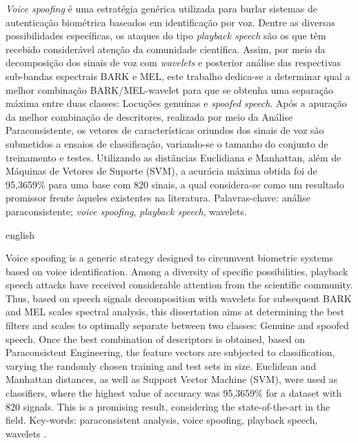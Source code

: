 \begin{resumo}
	\par \textit{Voice spoofing} é uma estratégia genérica utilizada para burlar sistemas de autenticação biométrica baseados em identificação por voz. Dentre as diversas possibilidades específicas, os ataques do tipo \textit{playback speech} são os que têm recebido considerável atenção da comunidade científica. Assim, por meio da decomposição dos sinais de voz com \textit{wavelets} e posterior análise das respectivas sub-bandas espectrais BARK e MEL, este trabalho dedica-se a determinar qual a melhor combinação BARK/MEL-wavelet para que se obtenha uma separação máxima entre duas classes: Locuções genuínas e \textit{spoofed speech}. Após a apuração da melhor combinação de descritores, realizada por meio da Análise Paraconsistente, os vetores de características oriundos dos sinais de voz são submetidos a ensaios de classificação, variando-se o tamanho do conjunto de treinamento e testes. Utilizando as distâncias Euclidiana e Manhattan, além de Máquinas de Vetores de Suporte (SVM), a acurácia máxima obtida foi de 95,3659\% para uma base com 820 sinais, a qual considera-se como um resultado promissor frente àqueles existentes na literatura.\newline\newline
	Palavras-chave: análise paraconsistente; \textit{voice spoofing}, \textit{playback speech}, wavelets.
\end{resumo}

\begin{resumo}[Abstract]
	\begin{otherlanguage*}{english}
		\par Voice spoofing is a generic strategy designed to circumvent biometric systems based on voice identification. Among a diversity of specific possibilities, playback speech attacks have received considerable attention from the scientific community. Thus, based on speech signals decomposition with wavelets for subsequent BARK and MEL scales spectral analysis, this dissertation aims at determining the best filters and scales to optimally separate between two classes: Genuine and spoofed speech. Once the best combination of descriptors is obtained, based on Paraconsistent Engineering, the feature vectors are subjected to classification, varying the randomly chosen training and test sets in size. Euclidean and Manhattan distances, as well as Support Vector Machine (SVM), were used as classifiers, where the highest value of accuracy was 95,3659\% for a dataset with 820 signals. This is a promising result, considering the state-of-the-art in the field. \newline\newline
		Key-words: paraconsistent analysis, voice spoofing, playback speech, wavelets .
	\end{otherlanguage*}
\end{resumo}

